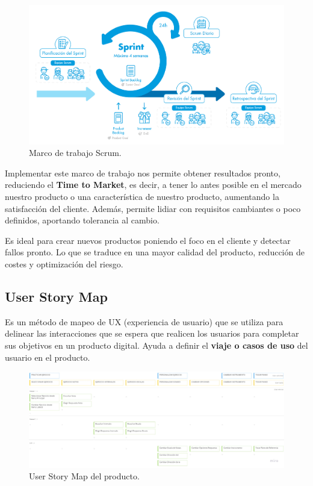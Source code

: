 \documentclass[12pt,twoside,titlepage]{report}
\begin{document}
\begin{figure}[H]
    \centering
    \includegraphics[scale=0.39]{Scrum/Scrum}
    \caption{Marco de trabajo Scrum.}
    \label{fig:Scrum}
\end{figure}

Implementar este marco de trabajo nos permite obtener resultados pronto, reduciendo el \textbf{Time to Market}, es decir, a tener lo antes posible en el mercado nuestro producto o una característica de nuestro producto, aumentando la satisfacción del cliente. Además, permite lidiar con requisitos cambiantes o poco definidos, aportando tolerancia al cambio.

Es ideal para crear nuevos productos poniendo el foco en el cliente y detectar fallos pronto. Lo que se traduce en una mayor calidad del producto, reducción de costes y optimización del riesgo.

\subsection{User Story Map}

Es un método de mapeo de UX (experiencia de usuario) que se utiliza para delinear las interacciones que se espera que realicen los usuarios para completar sus objetivos en un producto digital. Ayuda a definir el \textbf{viaje o casos de uso} del usuario en el producto.

\begin{figure}[H]
    \centering
    \includegraphics[width=\textwidth]{Scrum/UserStoryMap}
    \caption{User Story Map del producto.}
    \label{fig:UserStoryMap}
\end{figure}
\end{document}
